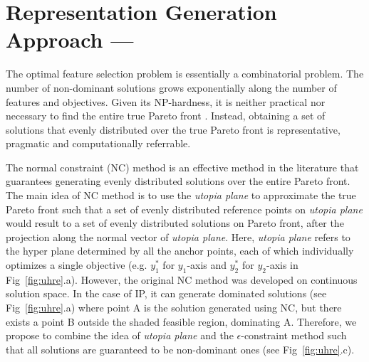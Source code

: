 \section{Representation Generation Approach --- \ourSol}\label{sec:solution}
\vspace{-1mm}
The optimal feature selection problem is essentially a combinatorial problem. %
The number of non-dominant solutions grows exponentially along the number of features and objectives. Given its NP-hardness, it is neither practical nor necessary to find the entire true Pareto front \cite{koksalan2009multiobjective}. %
Instead, obtaining a set of solutions that evenly distributed over the true Pareto front is representative, pragmatic and computationally referrable.

The normal constraint (NC) method \cite{normalCons} is an effective method in the literature that guarantees generating evenly distributed solutions over the entire Pareto front. The main idea of NC method is to use the \emph{utopia plane} to approximate the true Pareto front such that a set of evenly distributed reference points on \emph{utopia plane} would result to a set of evenly distributed solutions on Pareto front, after the projection along the normal vector of \emph{utopia plane}. Here, \emph{utopia plane} refers to the hyper plane determined by all the anchor points, each of which individually optimizes a single objective (e.g. $y_{1}^*$ for $y_1$-axis and $y_{2}^*$ for $y_2$-axis in Fig~\ref{fig:uhre}.a). However, the original NC method was developed on continuous solution space. In the case of IP, it can generate dominated solutions (see Fig~\ref{fig:uhre}.a) where point A is the solution generated using NC, but there exists a point B outside the shaded feasible region, dominating A. Therefore, we propose to combine the idea of \emph{utopia plane} and the $\epsilon$-constraint method such that all solutions are guaranteed to be non-dominant ones (see Fig~\ref{fig:uhre}.c).

